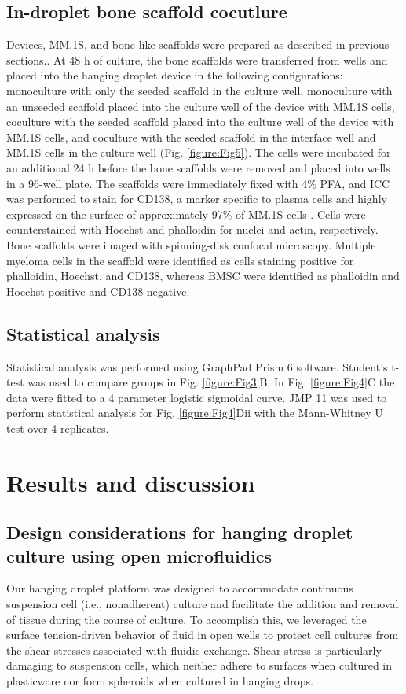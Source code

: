 \subsection{In-droplet bone scaffold cocutlure}
Devices, MM.1S, and bone-like scaffolds were prepared as described in previous sections.. At 48 h of culture, the bone scaffolds were transferred from wells and placed into the hanging droplet device in the following configurations: monoculture with only the seeded scaffold in the culture well, monoculture with an unseeded scaffold placed into the culture well of the device with MM.1S cells, coculture with the seeded scaffold placed into the culture well of the device with MM.1S cells, and coculture with the seeded scaffold in the interface well and MM.1S cells in the culture well (Fig. \ref{figure:Fig5}). The cells were incubated for an additional 24 h before the bone scaffolds were removed and placed into wells in a 96-well plate. The scaffolds were immediately fixed with 4\% PFA, and ICC was performed to stain for CD138, a marker specific to plasma cells and highly expressed on the surface of approximately 97\% of MM.1S cells \cite{Paino2014}. Cells were counterstained with Hoechst and phalloidin for nuclei and actin, respectively. Bone scaffolds were imaged with spinning-disk confocal microscopy. Multiple myeloma cells in the scaffold were identified as cells staining positive for phalloidin, Hoechst, and CD138, whereas BMSC were identified as phalloidin and Hoechst positive and CD138 negative.


\subsection{Statistical analysis}
Statistical analysis was performed using GraphPad Prism 6 software. Student's t-test was used to compare groups in Fig. \ref{figure:Fig3}B.  In Fig. \ref{figure:Fig4}C the data were fitted to a 4 parameter logistic sigmoidal curve. JMP 11 was used to perform statistical analysis for Fig.  \ref{figure:Fig4}Dii with the Mann-Whitney U test over 4 replicates.

\section{Results and discussion}
\subsection{Design considerations for hanging droplet culture using open microfluidics}
Our hanging droplet platform was designed to accommodate continuous suspension cell (i.e., nonadherent) culture and facilitate the addition and removal of tissue during the course of culture. To accomplish this, we leveraged the surface tension-driven behavior of fluid in open wells to protect cell cultures from the shear stresses associated with fluidic exchange. Shear stress is particularly damaging to suspension cells, which neither adhere to surfaces when cultured in plasticware nor form spheroids when cultured in hanging drops. 

